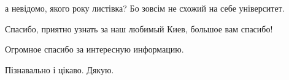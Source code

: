  
 
 
 
 

а невідомо, якого року листівка? Бо зовсім не схожий на себе університет.

Спасибо, приятно узнать за наш любимый Киев, большое вам спасибо!

Огромное спасибо за
интересную информацию.

Пізнавально і цікаво. Дякую.
